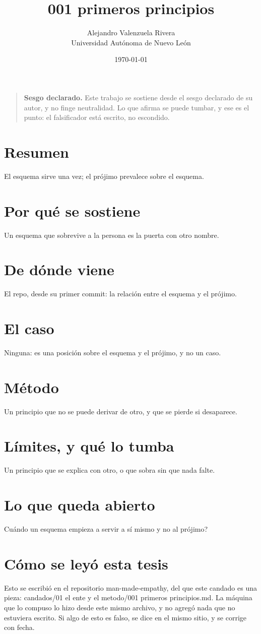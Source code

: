 \documentclass[11pt,a4paper]{article}
\title{001 primeros principios}
\author{Alejandro Valenzuela Rivera\\\small Universidad Autónoma de Nuevo León}
\date{\today}
\begin{document}
\maketitle

\begin{quote}
\textbf{Sesgo declarado.} Este trabajo se sostiene desde el sesgo declarado de su autor, y no finge neutralidad. Lo que afirma se puede tumbar, y ese es el punto: el falsificador está escrito, no escondido.
\end{quote}

\section*{Resumen}
El esquema sirve una vez; el prójimo prevalece sobre el esquema.

\section{Por qué se sostiene}
Un esquema que sobrevive a la persona es la puerta con otro nombre.

\section{De dónde viene}
El repo, desde su primer commit: la relación entre el esquema y el prójimo.

\section{El caso}
Ninguna: es una posición sobre el esquema y el prójimo, y no un caso.

\section{Método}
Un principio que no se puede derivar de otro, y que se pierde si desaparece.

\section{Límites, y qué lo tumba}
Un principio que se explica con otro, o que sobra sin que nada falte.

\section{Lo que queda abierto}
\textquestiondown{}Cuándo un esquema empieza a servir a sí mismo y no al prójimo?

\section*{Cómo se leyó esta tesis}
Esto se escribió en el repositorio man-made-empathy, del que este candado es una pieza: candados/01 el ente y el metodo/001 primeros principios.md. La máquina que lo compuso lo hizo desde este mismo archivo, y no agregó nada que no estuviera escrito. Si algo de esto es falso, se dice en el mismo sitio, y se corrige con fecha.
\end{document}
